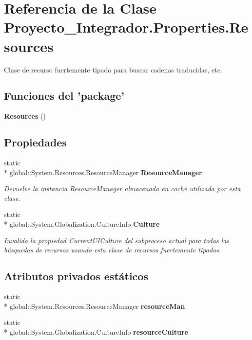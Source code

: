 \section{Referencia de la Clase Proyecto\-\_\-\-Integrador.\-Properties.\-Resources}
\label{class_proyecto___integrador_1_1_properties_1_1_resources}


Clase de recurso fuertemente tipado para buscar cadenas traducidas, etc.  


\subsection*{Funciones del 'package'}
\begin{DoxyCompactItemize}
\item 
{\bf Resources} ()
\end{DoxyCompactItemize}
\subsection*{Propiedades}
\begin{DoxyCompactItemize}
\item 
static \\*
global\-::\-System.\-Resources.\-Resource\-Manager {\bf Resource\-Manager}\hspace{0.3cm}{\ttfamily  [get]}
\begin{DoxyCompactList}\small\item\em Devuelve la instancia Resource\-Manager almacenada en caché utilizada por esta clase. \end{DoxyCompactList}\item 
static \\*
global\-::\-System.\-Globalization.\-Culture\-Info {\bf Culture}\hspace{0.3cm}{\ttfamily  [get, set]}
\begin{DoxyCompactList}\small\item\em Invalida la propiedad Current\-U\-I\-Culture del subproceso actual para todas las búsquedas de recursos usando esta clase de recursos fuertemente tipados. \end{DoxyCompactList}\end{DoxyCompactItemize}
\subsection*{Atributos privados estáticos}
\begin{DoxyCompactItemize}
\item 
static \\*
global\-::\-System.\-Resources.\-Resource\-Manager {\bf resource\-Man}
\item 
static \\*
global\-::\-System.\-Globalization.\-Culture\-Info {\bf resource\-Culture}
\end{DoxyCompactItemize}


